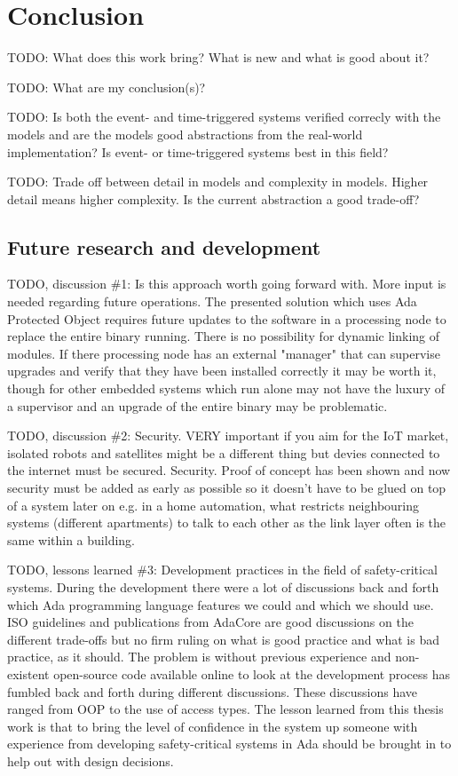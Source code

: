 \chapter{Conclusion}\label{ch:conclusion}
TODO: What does this work bring? What is new and what is good about it?

TODO: What are my conclusion(s)?

TODO: Is both the event- and time-triggered systems verified correcly with the
models and are the models good abstractions from the real-world implementation?
Is event- or time-triggered systems best in this field?

TODO: Trade off between detail in models and complexity in models. Higher
detail means higher complexity. Is the current abstraction a good trade-off?


\section{Future research and development}
TODO, discussion \#1: Is this approach worth going forward with. More input is
needed regarding future operations. The presented solution which uses Ada
Protected Object requires future updates to the software in a processing node
to replace the entire binary running. There is no possibility for dynamic
linking of modules.  If there processing node has an external "manager" that
can supervise upgrades and verify that they have been installed correctly it
may be worth it, though for other embedded systems which run alone may not have
the luxury of a supervisor and an upgrade of the entire binary may be
problematic.

TODO, discussion \#2: Security. VERY important if you aim for the IoT market,
isolated robots and satellites might be a different thing but devies connected
to the internet must be secured. Security. Proof of concept has been shown and
now security must be added as early as possible so it doesn't have to be glued
on top of a system later on e.g. in a home automation, what restricts
neighbouring systems (different apartments) to talk to each other as the link
layer often is the same within a building.

TODO, lessons learned \#3: Development practices in the field of
safety-critical systems. During the development there were a lot of discussions
back and forth which Ada programming language features we could and which we
should use. ISO guidelines and publications from AdaCore are good discussions
on the different trade-offs but no firm ruling on what is good practice and
what is bad practice, as it should. The problem is without previous experience
and non-existent open-source code available online to look at the development
process has fumbled back and forth during different discussions. These
discussions have ranged from OOP to the use of access types. The lesson learned
from this thesis work is that to bring the level of confidence in the system
up someone with experience from developing safety-critical systems in Ada
should be brought in to help out with design decisions.

